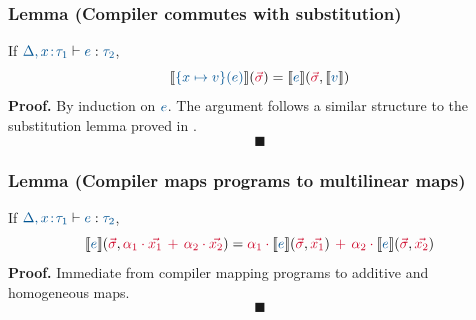 \subsubsection{Lemma (Compiler commutes with substitution)}
If $\p{\D,\bind{x}{\ty_1}}{e}{\ty_2}$,
\[
\cm{\{x \map v\}(e)}(\svec)=\cm{e}(\svec,\cm{v})
\]
\t{\textbf{Proof.}} By induction on $\es$. The argument follows a similar structure to the substitution lemma proved in \citep{velez2026compiling2}.
\[
\blacksquare
\]


\subsubsection{Lemma (Compiler maps programs to multilinear maps)}
If $\p{\D,\bind{x}{\ty_1}}{e}{\ty_2}$,
\[
\cm{e}(\svec,\a1\rt\xv1\rp\a2\rt\xv2)=\a1\rt\cm{e}(\svec,\xv1)\rp \a2\rt\cm{e}(\svec,\xv2)
\]
\t{\textbf{Proof.}} Immediate from compiler mapping programs to additive and homogeneous maps.
\[
\blacksquare
\]

